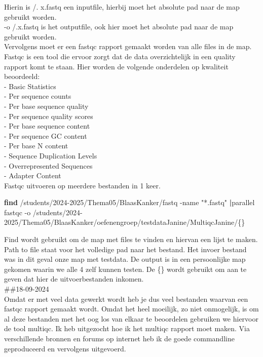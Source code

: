 \documentclass[
]{article}
\newenvironment{Shaded}{\begin{snugshade}}{\end{snugshade}}
\newcommand{\AttributeTok}[1]{\textcolor[rgb]{0.13,0.29,0.53}{#1}}
\newcommand{\ExtensionTok}[1]{#1}
\newcommand{\FunctionTok}[1]{\textcolor[rgb]{0.13,0.29,0.53}{\textbf{#1}}}
\newcommand{\KeywordTok}[1]{\textcolor[rgb]{0.13,0.29,0.53}{\textbf{#1}}}
\newcommand{\NormalTok}[1]{#1}
\newcommand{\StringTok}[1]{\textcolor[rgb]{0.31,0.60,0.02}{#1}}
\begin{document}
Hierin is /. x.fastq een inputfile, hierbij moet het absolute pad naar
de map gebruikt worden.\\
-o /.x.fastq is het outputfile, ook hier moet het absolute pad naar de
map gebruikt worden.\\

Vervolgens moet er een fastqc rapport gemaakt worden van alle files in
de map. Fastqc is een tool die ervoor zorgt dat de data overzichtelijk
in een quality rapport komt te staan. Hier worden de volgende onderdelen
op kwaliteit beoordeeld:\\
- Basic Statistics\\
- Per sequence counts\\
- Per base sequence quality\\
- Per sequence quality scores\\
- Per base sequence content\\
- Per sequence GC content\\
- Per base N content\\
- Sequence Duplication Levels\\
- Overrepresented Sequences\\
- Adapter Content\\

Fastqc uitvoeren op meerdere bestanden in 1 keer.

\begin{Shaded}
\begin{Highlighting}[]
\FunctionTok{find}\NormalTok{ /students/2024{-}2025/Thema05/BlaasKanker/fastq }\AttributeTok{{-}name} \StringTok{"*.fastq"} \KeywordTok{|}\ExtensionTok{parallel}\NormalTok{ fastqc }\AttributeTok{{-}o}\NormalTok{ /students/2024{-}2025/Thema05/BlaasKanker/oefenengroep/testdataJanine/MultiqcJanine/\{\}}
\end{Highlighting}
\end{Shaded}

Find wordt gebruikt om de map met files te vinden en hiervan een lijst
te maken. Path to file staat voor het volledige pad naar het bestand.
Het invoer bestand was in dit geval onze map met testdata. De output is
in een persoonlijke map gekomen waarin we alle 4 zelf kunnen testen. De
\{\} wordt gebruikt om aan te geven dat hier de uitvoerbestanden
inkomen.\\

\#\#18-09-2024\\
Omdat er met veel data gewerkt wordt heb je dus veel bestanden waarvan
een fastqc rapport gemaakt wordt. Omdat het heel moeilijk, zo niet
onmogelijk, is om al deze bestanden met het oog los van elkaar te
beoordelen gebruiken we hiervoor de tool multiqc. Ik heb uitgezocht hoe
ik het multiqc rapport moet maken. Via verschillende bronnen en forums
op internet heb ik de goede commandline geproduceerd en vervolgens
uitgevoerd.\\
\end{document}
